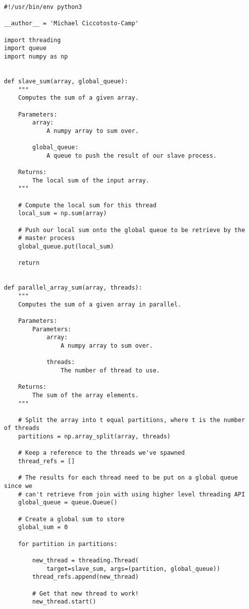 \begin{verbatim}
#!/usr/bin/env python3

__author__ = 'Michael Ciccotosto-Camp'

import threading
import queue
import numpy as np


def slave_sum(array, global_queue):
    """
    Computes the sum of a given array.

    Parameters:
        array:
            A numpy array to sum over.

        global_queue:
            A queue to push the result of our slave process.

    Returns:
        The local sum of the input array.
    """

    # Compute the local sum for this thread
    local_sum = np.sum(array)

    # Push our local sum onto the global queue to be retrieve by the
    # master process
    global_queue.put(local_sum)

    return


def parallel_array_sum(array, threads):
    """
    Computes the sum of a given array in parallel.

    Parameters:
        Parameters:
            array:
                A numpy array to sum over.

            threads:
                The number of thread to use.

    Returns:
        The sum of the array elements.
    """

    # Split the array into t equal partitions, where t is the number of threads
    partitions = np.array_split(array, threads)

    # Keep a reference to the threads we've spawned
    thread_refs = []

    # The results for each thread need to be put on a global queue since we
    # can't retrieve from join with using higher level threading API
    global_queue = queue.Queue()

    # Create a global sum to store
    global_sum = 0

    for partition in partitions:

        new_thread = threading.Thread(
            target=slave_sum, args=(partition, global_queue))
        thread_refs.append(new_thread)

        # Get that new thread to work!
        new_thread.start()


\end{verbatim}
